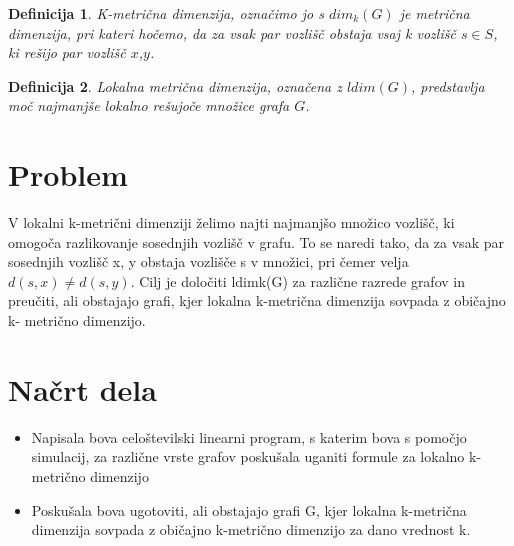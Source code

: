 \documentclass[a4paper,12pt]{article}
\newtheorem{definition}{Definicija}
\begin{document}
    \begin{definition}
        K-metrična dimenzija, označimo jo s $dim_k(G)$ je metrična dimenzija, 
        pri kateri hočemo, da za vsak par vozlišč obstaja vsaj k vozlišč $s \in S$, ki rešijo par vozlišč $x$,$y$.
    \end{definition}   
    
    \begin{definition}
        Lokalna metrična dimenzija, označena z $ldim(G)$, predstavlja moč najmanjše 
        lokalno rešujoče množice grafa $G$.
    \end{definition} 

\section{Problem} 
V lokalni k-metrični dimenziji želimo najti najmanjšo množico vozlišč, ki omogoča razlikovanje sosednjih 
vozlišč v grafu. To se naredi tako, da za vsak par sosednjih vozlišč x, y obstaja vozlišče s v množici, 
pri čemer velja $d(s, x) \neq d(s, y)$. Cilj je določiti ldimk(G) za različne razrede grafov in preučiti, 
ali obstajajo grafi, kjer lokalna k-metrična dimenzija sovpada z običajno k- metrično dimenzijo.    


\section{Načrt dela}
    \begin{itemize}
        \item Napisala bova celoštevilski linearni program, s katerim bova s pomočjo simulacij, 
        za različne vrste grafov poskušala uganiti formule za lokalno k-metrično dimenzijo
        \item Poskušala bova ugotoviti, ali obstajajo grafi G, kjer lokalna k-metrična dimenzija sovpada z 
        običajno k-metrično dimenzijo za dano vrednost k.
    \end{itemize}
\end{document}
